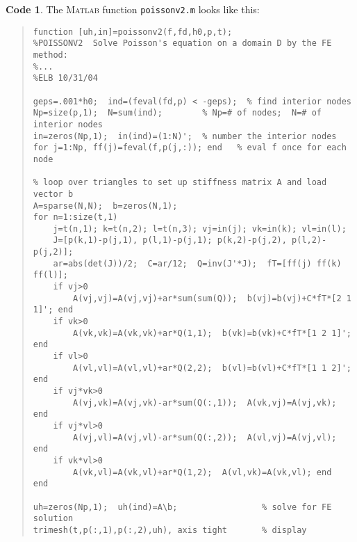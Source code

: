 \documentclass[12pt]{amsart}
\theoremstyle{definition}
\newtheorem*{code}{Code}
\newcommand{\Matlab}{\textsc{Matlab}\xspace}
\begin{document}
\label{codepage}
\begin{code}  The \Matlab function \texttt{poissonv2.m} looks like this:
\medskip
\small\begin{quote}\begin{verbatim}
function [uh,in]=poissonv2(f,fd,h0,p,t);
%POISSONV2  Solve Poisson's equation on a domain D by the FE method:
%...
%ELB 10/31/04

geps=.001*h0;  ind=(feval(fd,p) < -geps);  % find interior nodes
Np=size(p,1);  N=sum(ind);        % Np=# of nodes;  N=# of interior nodes
in=zeros(Np,1);  in(ind)=(1:N)';  % number the interior nodes
for j=1:Np, ff(j)=feval(f,p(j,:)); end   % eval f once for each node

% loop over triangles to set up stiffness matrix A and load vector b
A=sparse(N,N);  b=zeros(N,1);
for n=1:size(t,1)
    j=t(n,1); k=t(n,2); l=t(n,3); vj=in(j); vk=in(k); vl=in(l);
    J=[p(k,1)-p(j,1), p(l,1)-p(j,1); p(k,2)-p(j,2), p(l,2)-p(j,2)];
    ar=abs(det(J))/2;  C=ar/12;  Q=inv(J'*J);  fT=[ff(j) ff(k) ff(l)];
    if vj>0
        A(vj,vj)=A(vj,vj)+ar*sum(sum(Q));  b(vj)=b(vj)+C*fT*[2 1 1]'; end
    if vk>0
        A(vk,vk)=A(vk,vk)+ar*Q(1,1);  b(vk)=b(vk)+C*fT*[1 2 1]'; end
    if vl>0
        A(vl,vl)=A(vl,vl)+ar*Q(2,2);  b(vl)=b(vl)+C*fT*[1 1 2]'; end
    if vj*vk>0
        A(vj,vk)=A(vj,vk)-ar*sum(Q(:,1));  A(vk,vj)=A(vj,vk); end
    if vj*vl>0
        A(vj,vl)=A(vj,vl)-ar*sum(Q(:,2));  A(vl,vj)=A(vj,vl); end
    if vk*vl>0
        A(vk,vl)=A(vk,vl)+ar*Q(1,2);  A(vl,vk)=A(vk,vl); end
end

uh=zeros(Np,1);  uh(ind)=A\b;                 % solve for FE solution
trimesh(t,p(:,1),p(:,2),uh), axis tight       % display
\end{verbatim}
\end{quote}\normalsize\medskip


\end{code}
\end{document}
